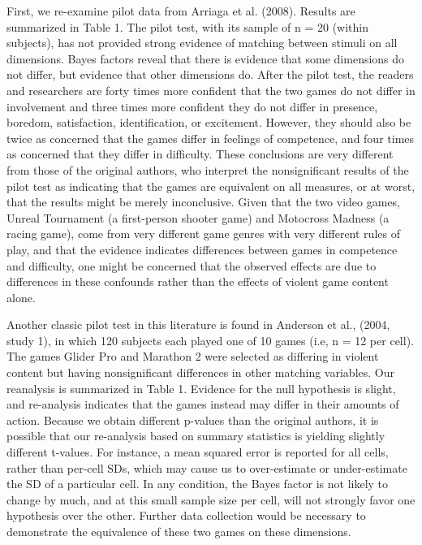 \documentclass{article}
\begin{document}
First, we re-examine pilot data from Arriaga et al. (2008). Results are summarized in Table 1. The pilot test, with its sample of n = 20 (within subjects), has not provided strong evidence of matching between stimuli on all dimensions. Bayes factors reveal that there is evidence that some dimensions do not differ, but evidence that other dimensions do. After the pilot test, the readers and researchers are forty times more confident that the two games do not differ in involvement and three times more confident they do not differ in presence, boredom, satisfaction, identification, or excitement. However, they should also be twice as concerned that the games differ in feelings of competence, and four times as concerned that they differ in difficulty. These conclusions are very different from those of the original authors, who interpret the nonsignificant results of the pilot test as indicating that the games are equivalent on all measures, or at worst, that the results might be merely inconclusive. Given that the two video games, Unreal Tournament (a first-person shooter game) and Motocross Madness (a racing game), come from very different game genres with very different rules of play, and that the evidence indicates differences between games in competence and difficulty, one might be concerned that the observed effects are due to differences in these confounds rather than the effects of violent game content alone.

Another classic pilot test in this literature is found in Anderson et al., (2004, study 1), in which 120 subjects each played one of 10 games (i.e, n = 12 per cell). The games Glider Pro and Marathon 2 were selected as differing in violent content but having nonsignificant differences in other matching variables. Our reanalysis is summarized in Table 1. Evidence for the null hypothesis is slight, and re-analysis indicates that the games instead may differ in their amounts of action. Because we obtain different p-values than the original authors, it is possible that our re-analysis based on summary statistics is yielding slightly different t-values. For instance, a mean squared error is reported for all cells, rather than per-cell SDs, which may cause us to over-estimate or under-estimate the SD of a particular cell. In any condition, the Bayes factor is not likely to change by much, and at this small sample size per cell, will not strongly favor one hypothesis over the other. Further data collection would be necessary to demonstrate the equivalence of these two games on these dimensions. 
\end{document}
